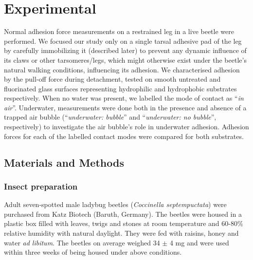 \documentclass[vruler,JEB]{COB}%
\begin{document}
\section{Experimental}

Normal adhesion force measurements on a restrained leg in a live
beetle were performed. We focused our study only on a single tarsal adhesive pad of the leg by carefully immobilizing it (described later) to prevent any dynamic influence of its claws or other tarsomeres/legs, which might otherwise exist under the beetle's natural walking conditions, influencing its adhesion. 
We characterised adhesion by the pull-off force
during detachment, tested on smooth untreated and
fluorinated glass surfaces representing hydrophilic and hydrophobic substrates
respectively. When no water was present, we labelled the mode of contact
as ``\emph{in air}''. Underwater, measurements
were done both in the presence and absence of a trapped air bubble (``\emph{underwater:
bubble}'' and ``\emph{underwater: no bubble}'', respectively) to
investigate the air bubble's role in underwater adhesion. Adhesion forces
for each of the labelled contact modes were compared for both substrates.

\subsection{Materials and Methods}

\subsubsection{Insect preparation}

Adult seven-spotted male ladybug beetles (\emph{Coccinella septempuctata})
were purchased from Katz Biotech (Baruth, Germany). The beetles were housed in a plastic box filled with leaves,
twigs and stones at room temperature and 60-80\% relative humidity
with natural daylight. They were fed with raisins, honey and
water \emph{ad libitum}. The beetles on average weighed 34 $\pm$ 4 mg and were used within three weeks of being housed under above conditions.
\end{document}
